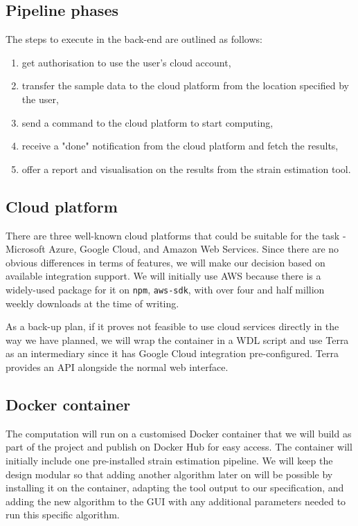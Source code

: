 \documentclass{report}
\begin{document}
\subsection{Pipeline phases}
The steps to execute in the back-end are outlined as follows:
\begin{enumerate}
    \item get authorisation to use the user's cloud account,
    \item transfer the sample data to the cloud platform from the location specified by the user,
    \item send a command to the cloud platform to start computing,
    \item receive a "done" notification from the cloud platform and fetch the results,
    \item offer a report and visualisation on the results from the strain estimation tool.
\end{enumerate}


\subsection {Cloud platform}
There are three well-known cloud platforms that could be suitable for the task - Microsoft Azure, Google Cloud, and Amazon Web Services. Since there are no obvious differences in terms of features, we will make our decision based on available integration support. We will initially use AWS because there is a widely-used package for it on \texttt{npm}, \texttt{aws-sdk}, with over four and half million weekly downloads at the time of writing.

As a back-up plan, if it proves not feasible to use cloud services directly in the way we have planned, we will wrap the container in a WDL script and use Terra as an intermediary since it has Google Cloud integration pre-configured. Terra provides an API alongside the normal web interface.


\subsection{Docker container}
The computation will run on a customised Docker container that we will build as part of the project and publish on Docker Hub for easy access. The container will initially include one pre-installed strain estimation pipeline. We will keep the design modular so that adding another algorithm later on will be possible by installing it on the container, adapting the tool output to our specification, and adding the new algorithm to the GUI with any additional parameters needed to run this specific algorithm.
\end{document}
